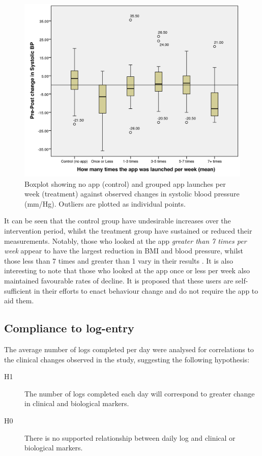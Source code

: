 \begin{figure}[h]
	\centering
    \includegraphics[scale=0.18, angle=0]{Files/prevention-study-3/figures/applaunch-bp}
  	\caption{Boxplot showing no app (control) and grouped app launches per week (treatment) against observed changes in systolic blood pressure (mm/Hg). Outliers are plotted as individual points.}
    \label{fig: applaunch-bp}
\end{figure}

It can be seen that the control group have undesirable increases over the intervention period, whilst the treatment group have sustained or reduced their measurements. Notably, those who looked at the app \textit{greater than 7 times per week} appear to have the largest reduction in BMI and blood pressure, whilst those less than 7 times and greater than 1 vary in their results \cite{Hartin2015-JMIR}. It is also interesting to note that those who looked at the app once or less per week also maintained favourable rates of decline. It is proposed that these users are self-sufficient in their efforts to enact behaviour change and do not require the app to aid them.

\subsection{Compliance to log-entry}
The average number of logs completed per day were analysed for correlations to the clinical changes observed in the study, suggesting the following hypothesis:
\begin{description}
  \item[H1] The number of logs completed each day will correspond to greater change in clinical and biological markers.
  \item[H0] There is no supported relationship between daily log and clinical or biological markers.
\end{description}


